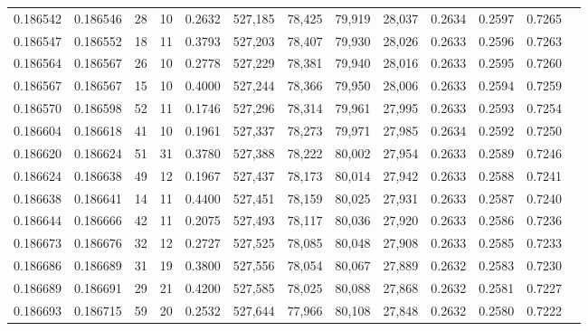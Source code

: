 \begin{tabular}{rrrrrrrrrrrrr}
0.186542 & 0.186546 &    28 &  10 &                                     0.2632 & 527,185 &  78,425 &  79,919 &  28,037 & 0.2634 & 0.2597 & 0.7265 \\
0.186547 & 0.186552 &    18 &  11 &                                     0.3793 & 527,203 &  78,407 &  79,930 &  28,026 & 0.2633 & 0.2596 & 0.7263 \\
0.186564 & 0.186567 &    26 &  10 &                                     0.2778 & 527,229 &  78,381 &  79,940 &  28,016 & 0.2633 & 0.2595 & 0.7260 \\
0.186567 & 0.186567 &    15 &  10 &                                     0.4000 & 527,244 &  78,366 &  79,950 &  28,006 & 0.2633 & 0.2594 & 0.7259 \\
0.186570 & 0.186598 &    52 &  11 &                                     0.1746 & 527,296 &  78,314 &  79,961 &  27,995 & 0.2633 & 0.2593 & 0.7254 \\
0.186604 & 0.186618 &    41 &  10 &                                     0.1961 & 527,337 &  78,273 &  79,971 &  27,985 & 0.2634 & 0.2592 & 0.7250 \\
0.186620 & 0.186624 &    51 &  31 &                                     0.3780 & 527,388 &  78,222 &  80,002 &  27,954 & 0.2633 & 0.2589 & 0.7246 \\
0.186624 & 0.186638 &    49 &  12 &                                     0.1967 & 527,437 &  78,173 &  80,014 &  27,942 & 0.2633 & 0.2588 & 0.7241 \\
0.186638 & 0.186641 &    14 &  11 &                                     0.4400 & 527,451 &  78,159 &  80,025 &  27,931 & 0.2633 & 0.2587 & 0.7240 \\
0.186644 & 0.186666 &    42 &  11 &                                     0.2075 & 527,493 &  78,117 &  80,036 &  27,920 & 0.2633 & 0.2586 & 0.7236 \\
0.186673 & 0.186676 &    32 &  12 &                                     0.2727 & 527,525 &  78,085 &  80,048 &  27,908 & 0.2633 & 0.2585 & 0.7233 \\
0.186686 & 0.186689 &    31 &  19 &                                     0.3800 & 527,556 &  78,054 &  80,067 &  27,889 & 0.2632 & 0.2583 & 0.7230 \\
0.186689 & 0.186691 &    29 &  21 &                                     0.4200 & 527,585 &  78,025 &  80,088 &  27,868 & 0.2632 & 0.2581 & 0.7227 \\
0.186693 & 0.186715 &    59 &  20 &                                     0.2532 & 527,644 &  77,966 &  80,108 &  27,848 & 0.2632 & 0.2580 & 0.7222 \\

\end{tabular}
